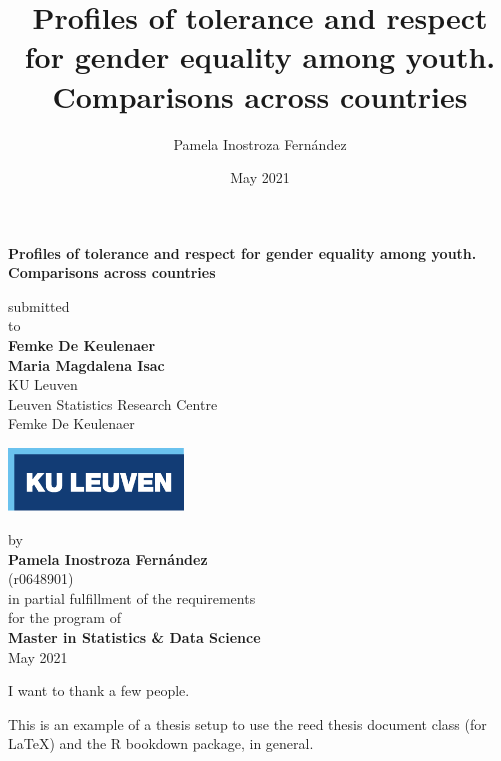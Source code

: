 \documentclass[12pt,twoside]{reedthesis}
\title{Profiles of tolerance and respect for gender equality among youth. Comparisons across countries}
\author{Pamela Inostroza Fernández}
\date{May 2021}
\institute{Leuven Statistics Research Centre}
\begin{document}
\thispagestyle{empty}
\begin{center}
  {\Large{\bf Profiles of tolerance and respect for gender equality among youth. Comparisons across countries}} \vspace{0.5cm}

   submitted \\\vspace{0.5cm}
  to \\\vspace{0.5cm}
  \textbf{Femke De Keulenaer} \\
  \textbf{Maria Magdalena Isac} \\\vspace{0.5cm}
  KU Leuven \\
  Leuven Statistics Research Centre \\
  Femke De Keulenaer \\
   \vspace{1cm}

  \includegraphics[width=0.35\textwidth]{KUL.pdf}
  
  by \\\vspace{0.5cm}
  \textbf{Pamela Inostroza Fernández} \\
  (r0648901) \\
  
  \medskip
  \medskip
  in partial fulfillment of the requirements \\
  for the program of \\
  \textbf{Master in Statistics \& Data Science} \\\vspace{0.5cm}
  May 2021
  
\end{center}
 \maketitle

\frontmatter %
\pagestyle{empty} %
  \begin{acknowledgements}
    I want to thank a few people.
  \end{acknowledgements}
  \begin{preface}
    This is an example of a thesis setup to use the reed thesis document class
    (for LaTeX) and the R bookdown package, in general.
  \end{preface}
  \hypersetup{linkcolor=black}
  \setcounter{secnumdepth}{2}
  \setcounter{tocdepth}{2}
  \tableofcontents
\end{document}
